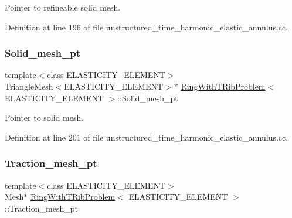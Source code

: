 Pointer to refineable solid mesh. 



Definition at line 196 of file unstructured\+\_\+time\+\_\+harmonic\+\_\+elastic\+\_\+annulus.\+cc.

\mbox{\label{classRingWithTRibProblem_ac9502dc1955f4d3d40adb5ca581aacb6}} 
\subsubsection{\texorpdfstring{Solid\+\_\+mesh\+\_\+pt}{Solid\_mesh\_pt}\hspace{0.1cm}{\footnotesize\ttfamily [2/2]}}
{\footnotesize\ttfamily template$<$class E\+L\+A\+S\+T\+I\+C\+I\+T\+Y\+\_\+\+E\+L\+E\+M\+E\+NT$>$ \\
Triangle\+Mesh$<$E\+L\+A\+S\+T\+I\+C\+I\+T\+Y\+\_\+\+E\+L\+E\+M\+E\+NT$>$$\ast$ \hyperlink{classRingWithTRibProblem}{Ring\+With\+T\+Rib\+Problem}$<$ E\+L\+A\+S\+T\+I\+C\+I\+T\+Y\+\_\+\+E\+L\+E\+M\+E\+NT $>$\+::Solid\+\_\+mesh\+\_\+pt\hspace{0.3cm}{\ttfamily [private]}}



Pointer to solid mesh. 



Definition at line 201 of file unstructured\+\_\+time\+\_\+harmonic\+\_\+elastic\+\_\+annulus.\+cc.

\mbox{\label{classRingWithTRibProblem_abf11b5c5d0c63c91ca7b248c18acad5b}} 
\subsubsection{\texorpdfstring{Traction\+\_\+mesh\+\_\+pt}{Traction\_mesh\_pt}}
{\footnotesize\ttfamily template$<$class E\+L\+A\+S\+T\+I\+C\+I\+T\+Y\+\_\+\+E\+L\+E\+M\+E\+NT$>$ \\
Mesh$\ast$ \hyperlink{classRingWithTRibProblem}{Ring\+With\+T\+Rib\+Problem}$<$ E\+L\+A\+S\+T\+I\+C\+I\+T\+Y\+\_\+\+E\+L\+E\+M\+E\+NT $>$\+::Traction\+\_\+mesh\+\_\+pt\hspace{0.3cm}{\ttfamily [private]}}



